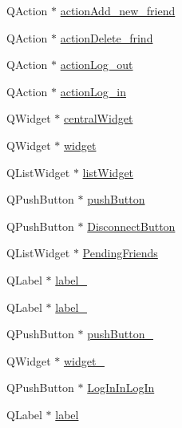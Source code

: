 \begin{DoxyCompactItemize}
\item 
Q\+Action $\ast$ \mbox{\hyperlink{classUi__MainWindow_a913277c15b0beaf07378557ec1f8add2}{action\+Add\+\_\+new\+\_\+friend}}
\item 
Q\+Action $\ast$ \mbox{\hyperlink{classUi__MainWindow_a0b0c6642f7ac71a1ff2dfdaeccc86a4b}{action\+Delete\+\_\+frind}}
\item 
Q\+Action $\ast$ \mbox{\hyperlink{classUi__MainWindow_a1888eb56e1afbdaeaa88441f78df4d72}{action\+Log\+\_\+out}}
\item 
Q\+Action $\ast$ \mbox{\hyperlink{classUi__MainWindow_ae2c1a54d82e0ecbf1da1f993d8ce4833}{action\+Log\+\_\+in}}
\item 
Q\+Widget $\ast$ \mbox{\hyperlink{classUi__MainWindow_a30075506c2116c3ed4ff25e07ae75f81}{central\+Widget}}
\item 
Q\+Widget $\ast$ \mbox{\hyperlink{classUi__MainWindow_ab676f235c393f334b7c07935d4007925}{widget}}
\item 
Q\+List\+Widget $\ast$ \mbox{\hyperlink{classUi__MainWindow_ae647a15635ba8a0e5d5aec475db99d8f}{list\+Widget}}
\item 
Q\+Push\+Button $\ast$ \mbox{\hyperlink{classUi__MainWindow_ad332d93084584930878f1daf5f84cdbf}{push\+Button}}
\item 
Q\+Push\+Button $\ast$ \mbox{\hyperlink{classUi__MainWindow_a3e7bb11dd88ea748e69f406657a15274}{Disconnect\+Button}}
\item 
Q\+List\+Widget $\ast$ \mbox{\hyperlink{classUi__MainWindow_ad55e68018b044279f792e0d898b41c46}{Pending\+Friends}}
\item 
Q\+Label $\ast$ \mbox{\hyperlink{classUi__MainWindow_a663f728e6244926a795c6e6892673b1d}{label\+\_}}
\item 
Q\+Label $\ast$ \mbox{\hyperlink{classUi__MainWindow_a13936e6f18b1c90402b3c7a3c92b6cdb}{label\+\_}}
\item 
Q\+Push\+Button $\ast$ \mbox{\hyperlink{classUi__MainWindow_ac92cce0478c1025ace05ff4f8870bb1c}{push\+Button\+\_}}
\item 
Q\+Widget $\ast$ \mbox{\hyperlink{classUi__MainWindow_ac9e67c86fa4df2404df71f03147965b9}{widget\+\_}}
\item 
Q\+Push\+Button $\ast$ \mbox{\hyperlink{classUi__MainWindow_a93e47a26a58d5d030a8aa27ecf746dd2}{Log\+In\+In\+Log\+In}}
\item 
Q\+Label $\ast$ \mbox{\hyperlink{classUi__MainWindow_ad9c89133780f28e6efa2ec17ceb9cff5}{label}}
\item 

\end{DoxyCompactItemize}
